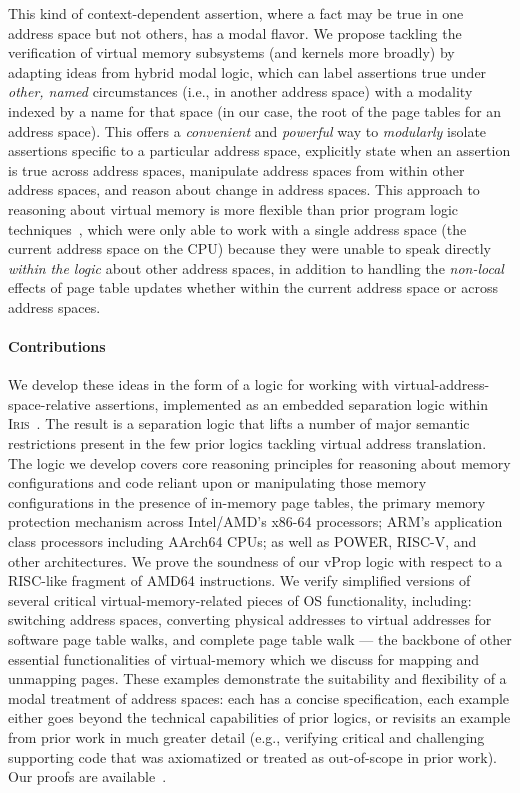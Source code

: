 This kind of context-dependent assertion, where a fact may be true in one address space but not others, has a modal flavor. 
We propose tackling the verification of virtual memory subsystems (and kernels more broadly) by adapting ideas from hybrid
modal logic, which can label assertions true under \emph{other, named} circumstances (i.e., in another address space) with a 
modality indexed by a name for that space (in our case, the root of the page tables for an address space). This offers a 
\textit{convenient} and \textit{powerful} way to \emph{modularly}
isolate assertions specific to a particular address space,
explicitly state when an assertion is true across address spaces,
manipulate address spaces from within other address spaces, and
reason about change in address spaces.
This approach to reasoning about virtual memory is more flexible than prior program logic techniques~\cite{kolanski08vstte,kolanski09tphols}, 
which were only able to work with a single address space (the current address space on the CPU) because they were unable
to speak directly \emph{within the logic} about other address spaces, in addition to handling
the \emph{non-local} effects of page table updates whether within the current address space or across address spaces.

\paragraph{Contributions}
We develop these ideas in the form of a logic for working with virtual-address-space-relative assertions,
implemented as an embedded separation logic within {\textsc{Iris}}~\cite{jung2018iris}.
The result is a separation logic that lifts a number of major semantic restrictions present in the few
prior logics tackling virtual address translation.
The logic we develop covers core reasoning principles for reasoning about memory configurations and code
reliant upon or manipulating those memory configurations in the presence of in-memory page tables, the primary
memory protection mechanism across Intel/AMD's x86-64 processors; ARM's application class processors including
AArch64 CPUs; as well as POWER, RISC-V, and other architectures.
We prove the soundness of our \textsf{vProp} logic with respect to a RISC-like fragment of \textsf{AMD64} instructions.
We verify simplified versions of several critical virtual-memory-related pieces of OS functionality, 
including:
switching address spaces, converting physical addresses to virtual addresses for
software page table walks, and  complete  page table walk  --- the backbone of other essential functionalities of
virtual-memory which we discuss for mapping and unmapping pages. 
These examples demonstrate the suitability and flexibility of
a modal treatment of address spaces: each has a concise specification, each example either goes beyond the technical
capabilities of prior logics, or revisits an example from prior work
  in much greater detail (e.g., verifying critical and challenging supporting code that was
  axiomatized or treated as out-of-scope in prior work).
Our proofs are available~\cite{artifact}.

